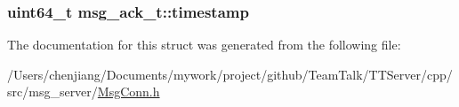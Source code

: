 \subsubsection[{timestamp}]{\setlength{\rightskip}{0pt plus 5cm}uint64\+\_\+t msg\+\_\+ack\+\_\+t\+::timestamp}\label{structmsg__ack__t_a7ed6d2331362b63c760ee04b41fbcc00}


The documentation for this struct was generated from the following file\+:\begin{DoxyCompactItemize}
\item 
/\+Users/chenjiang/\+Documents/mywork/project/github/\+Team\+Talk/\+T\+T\+Server/cpp/src/msg\+\_\+server/\hyperlink{_msg_conn_8h}{Msg\+Conn.\+h}\end{DoxyCompactItemize}
